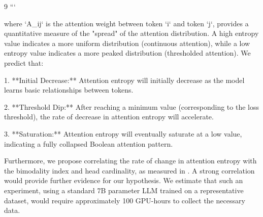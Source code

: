 \documentclass[11pt]{article}
\theoremstyle{definition}
\begin{document}
\begin{thebibliography}{9}
```













where `A_{ij}` is the attention weight between token `i` and token `j`, provides a quantitative measure of the "spread" of the attention distribution.  A high entropy value indicates a more uniform distribution (continuous attention), while a low entropy value indicates a more peaked distribution (thresholded attention). We predict that:













1.  **Initial Decrease:**  Attention entropy will initially decrease as the model learns basic relationships between tokens.






2.  **Threshold Dip:** After reaching a minimum value (corresponding to the loss threshold), the rate of decrease in attention entropy will accelerate.






3.  **Saturation:**  Attention entropy will eventually saturate at a low value, indicating a fully collapsed Boolean attention pattern.













Furthermore, we propose correlating the rate of change in attention entropy with the bimodality index and head cardinality, as measured in \cite{mimo2024empirical}.  A strong correlation would provide further evidence for our hypothesis.  We estimate that such an experiment, using a standard 7B parameter LLM trained on a representative dataset, would require approximately 100 GPU-hours to collect the necessary data.














\end{thebibliography}
\end{document}
